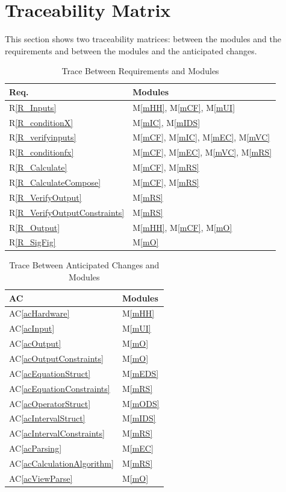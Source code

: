 \documentclass[12pt, titlepage]{article}
\newcommand{\rref}[1]{R\ref{#1}}
\newcommand{\acref}[1]{AC\ref{#1}}
\newcommand{\mref}[1]{M\ref{#1}}
\begin{document}
\newpage

\section{Traceability Matrix} 
\label{SecTM}
This section shows two traceability matrices: between the modules and the
requirements and between the modules and the anticipated changes.

\begin{table}[H]
\centering
\begin{tabular}{p{} p{}}
\toprule
\textbf{Req.} & \textbf{Modules}\\
\midrule
\rref{R_Inputs} & \mref{mHH}, \mref{mCF}, \mref{mUI}\\
\rref{R_conditionX} & \mref{mIC}, \mref{mIDS}\\
\rref{R_verifyinputs} & \mref{mCF}, \mref{mIC}, \mref{mEC}, \mref{mVC}\\
\rref{R_conditionfx} & \mref{mCF}, \mref{mEC}, \mref{mVC}, \mref{mRS}\\
\rref{R_Calculate} & \mref{mCF}, \mref{mRS}\\
\rref{R_CalculateCompose} & \mref{mCF}, \mref{mRS}\\
\rref{R_VerifyOutput} & \mref{mRS}\\
\rref{R_VerifyOutputConstraints} & \mref{mRS}\\
\rref{R_Output} & \mref{mHH}, \mref{mCF}, \mref{mO}\\
\rref{R_SigFig} & \mref{mO}\\
\bottomrule
\end{tabular}
\caption{Trace Between Requirements and Modules}
\label{TblRT}
\end{table}

\begin{table}[H]
\centering
\begin{tabular}{p{} p{}}
\toprule
\textbf{AC} & \textbf{Modules}\\
\midrule
\acref{acHardware} & \mref{mHH}\\
\acref{acInput} & \mref{mUI}\\
\acref{acOutput} & \mref{mO}\\
\acref{acOutputConstraints} & \mref{mO}\\
\acref{acEquationStruct} & \mref{mEDS}\\
\acref{acEquationConstraints} & \mref{mRS}\\
\acref{acOperatorStruct} & \mref{mODS} \\
\acref{acIntervalStruct} & \mref{mIDS}\\
\acref{acIntervalConstraints} & \mref{mRS}\\
\acref{acParsing} & \mref{mEC}\\
\acref{acCalculationAlgorithm} & \mref{mRS}\\
\acref{acViewParse} & \mref{mO}\\
\bottomrule
\end{tabular}
\caption{Trace Between Anticipated Changes and Modules}
\label{TblACT}
\end{table}
\end{document}
